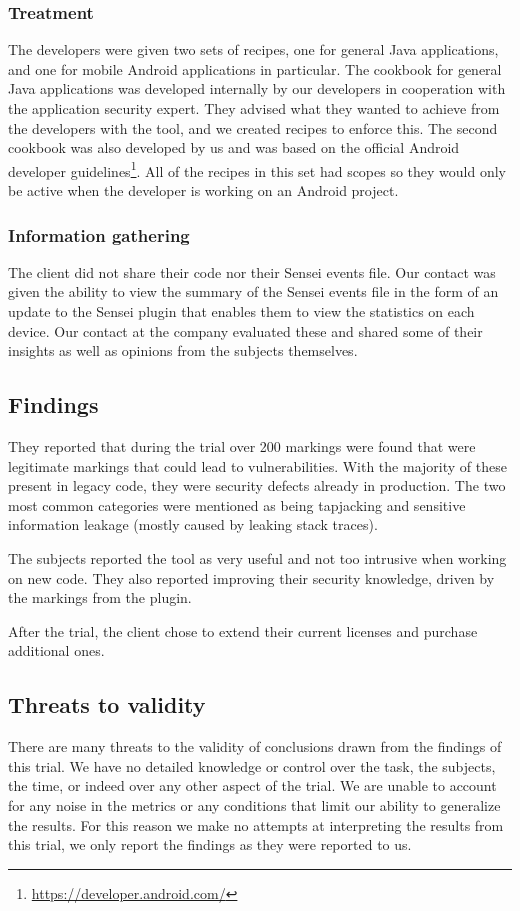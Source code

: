 \subsubsection{Treatment}
The developers were given two sets of recipes, one for general Java applications, and one for mobile Android applications in particular.
The cookbook for general Java applications was developed internally by our developers in cooperation with the application security expert.
They advised what they wanted to achieve from the developers with the tool, and we created recipes to enforce this.
The second cookbook was also developed by us and was based on the official Android developer guidelines\footnote{\url{https://developer.android.com/}}.
All of the recipes in this set had scopes so they would only be active when the developer is working on an Android project.

\subsubsection{Information gathering}
The client did not share their code nor their Sensei events file.
Our contact was given the ability to view the summary of the Sensei events file in the form of an update to the Sensei plugin that enables them to view the statistics on each device.
Our contact at the company evaluated these and shared some of their insights as well as opinions from the subjects themselves.

\subsection{Findings}
They reported that during the trial over 200 markings were found that were legitimate markings that could lead to vulnerabilities. With the majority of these present in legacy code, they were \glspl{security defect} already in production. The two most common categories were mentioned as being tapjacking and sensitive information leakage (mostly caused by leaking stack traces).

The subjects reported the tool as very useful and not too intrusive when working on new code. They also reported improving their security knowledge, driven by the markings from the plugin.

After the trial, the client chose to extend their current licenses and purchase additional ones.

\subsection{Threats to validity}
There are many threats to the validity of conclusions drawn from the findings of this trial. We have no detailed knowledge or control over the task, the subjects, the time, or indeed over any other aspect of the trial. We are unable to account for any noise in the metrics or any conditions that limit our ability to generalize the results. For this reason we make no attempts at interpreting the results from this trial, we only report the findings as they were reported to us.